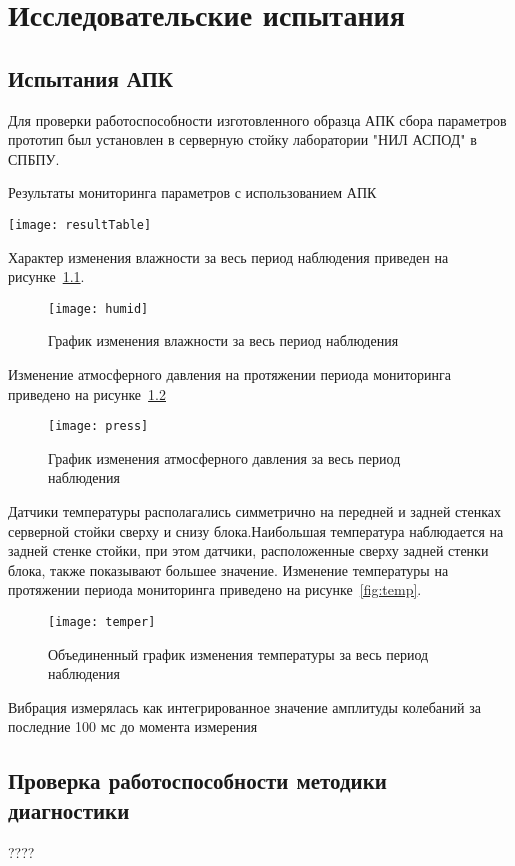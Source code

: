 
\chapter{Исследовательские испытания}


\section{Испытания АПК}
Для проверки работоспособности изготовленного образца АПК сбора параметров прототип был установлен в серверную стойку лаборатории "НИЛ АСПОД" в СПБПУ.
 
\begin{table}
	\captionsetup{skip=5pt}
	\caption{Результаты мониторинга параметров с использованием АПК}
	\centering
	\texttt{[image: resultTable]}
	\label{tab:result}
\end{table}

Характер  изменения влажности  за  весь  период  наблюдения  приведен  на  рисунке~\ref{fig:humid}.

\begin{figure}[h]
	\centering
	\texttt{[image: humid]}
	\caption{График изменения влажности за весь период наблюдения}
	\label{fig:humid}
\end{figure}

Изменение  атмосферного давления  на протяжении периода мониторинга приведено на рисунке~\ref{fig:press}

 \begin{figure}[h]
 	\centering
 	\texttt{[image: press]}
 	\caption{График изменения атмосферного давления за весь период наблюдения}
 	\label{fig:press}
 \end{figure}

Датчики  температуры  располагались  симметрично  на  передней  и задней стенках серверной стойки сверху и снизу блока.Наибольшая  температура  наблюдается  на  задней  стенке  стойки,  при этом датчики, расположенные сверху задней стенки блока, также показывают большее  значение.  Изменение  температуры  на  протяжении  периода 
мониторинга приведено на рисунке~\ref{fig:temp}.

\begin{figure}[h]
	\centering
	\texttt{[image: temper]}
	\caption{Объединенный график изменения температуры за весь период наблюдения}
	\label{fig:temper}
\end{figure}

Вибрация  измерялась  как  интегрированное  значение  амплитуды колебаний за последние 100 мс до момента измерения
\section{Проверка работоспособности методики диагностики}
????
